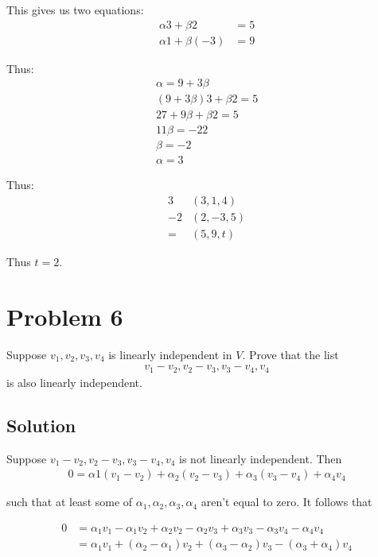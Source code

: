 \documentclass{article}
\begin{document}
This gives us two equations:
\begin{align*}
    \alpha 3 + \beta 2 &= 5\\
    \alpha 1 + \beta (-3) &= 9
\end{align*}

Thus:
\begin{align*}
    \alpha=9+3\beta\\
    (9+3\beta)3 +\beta2 = 5\\  
    27+9\beta + \beta 2 = 5\\
    11\beta=-22\\
    \beta=-2\\
    \alpha=3
\end{align*}

Thus:
\begin{align*}
    3&(3,1,4)\\
    -2&(2, -3, 5)\\
    = &(5, 9, t)
\end{align*}

Thus $t=2$.

\section*{Problem 6}
Suppose $v_1, v_2, v_3, v_4$ is linearly independent in $V$. Prove that the list
\begin{align*}
    v_1-v_2, v_2-v_3, v_3-v_4, v_4
\end{align*}
is also linearly independent.

\subsection*{Solution}
Suppose $v_1-v_2, v_2-v_3, v_3-v_4, v_4$ is not linearly independent. Then
\begin{align*}
    0=\alpha1(v_1-v_2) + \alpha_2(v_2-v_3) +\alpha_3(v_3-v_4)+\alpha_4 v_4
\end{align*}

such that at least some of $\alpha_1, \alpha_2, \alpha_3, \alpha_4$ aren't equal to zero. It follows that

\begin{align*}
    0&= \alpha_1 v_1 - \alpha_1 v_2 + \alpha_2 v_2 - \alpha_2 v_3 + \alpha_3 v_3 - \alpha_3 v_4 - \alpha_4 v_4 \\
    &= \alpha_1 v_1 + (\alpha_2 - \alpha_1) v_2  + (\alpha_3 - \alpha_2) v_3 - (\alpha_3 + \alpha_4) v_4
\end{align*}
\end{document}
